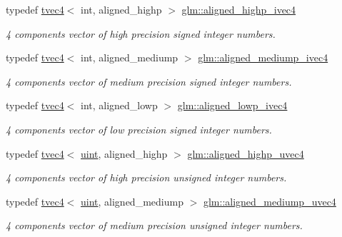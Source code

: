 \begin{DoxyCompactItemize}
typedef \mbox{\hyperlink{structglm_1_1tvec4}{tvec4}}$<$ int, aligned\+\_\+highp $>$ \mbox{\hyperlink{group__gtc__type__aligned_ga4dcc1c7c3d087b9f61635069fc97671b}{glm\+::aligned\+\_\+highp\+\_\+ivec4}}
\begin{DoxyCompactList}\small\item\em 4 components vector of high precision signed integer numbers. \end{DoxyCompactList}\item 
typedef \mbox{\hyperlink{structglm_1_1tvec4}{tvec4}}$<$ int, aligned\+\_\+mediump $>$ \mbox{\hyperlink{group__gtc__type__aligned_ga76b2981eb152332dd1404b00a15eac50}{glm\+::aligned\+\_\+mediump\+\_\+ivec4}}
\begin{DoxyCompactList}\small\item\em 4 components vector of medium precision signed integer numbers. \end{DoxyCompactList}\item 
typedef \mbox{\hyperlink{structglm_1_1tvec4}{tvec4}}$<$ int, aligned\+\_\+lowp $>$ \mbox{\hyperlink{group__gtc__type__aligned_ga7605da765c208f1008519a167dddd6d9}{glm\+::aligned\+\_\+lowp\+\_\+ivec4}}
\begin{DoxyCompactList}\small\item\em 4 components vector of low precision signed integer numbers. \end{DoxyCompactList}\item 
typedef \mbox{\hyperlink{structglm_1_1tvec4}{tvec4}}$<$ \mbox{\hyperlink{group__core__precision_ga4fd29415871152bfb5abd588334147c8}{uint}}, aligned\+\_\+highp $>$ \mbox{\hyperlink{group__gtc__type__aligned_ga15c8f3d51b9df35dbf8bf2276512588b}{glm\+::aligned\+\_\+highp\+\_\+uvec4}}
\begin{DoxyCompactList}\small\item\em 4 components vector of high precision unsigned integer numbers. \end{DoxyCompactList}\item 
typedef \mbox{\hyperlink{structglm_1_1tvec4}{tvec4}}$<$ \mbox{\hyperlink{group__core__precision_ga4fd29415871152bfb5abd588334147c8}{uint}}, aligned\+\_\+mediump $>$ \mbox{\hyperlink{group__gtc__type__aligned_gadce20b2c78b77cf2f08bc9c31d1a822e}{glm\+::aligned\+\_\+mediump\+\_\+uvec4}}
\begin{DoxyCompactList}\small\item\em 4 components vector of medium precision unsigned integer numbers. \end{DoxyCompactList}\item 

\end{DoxyCompactItemize}
